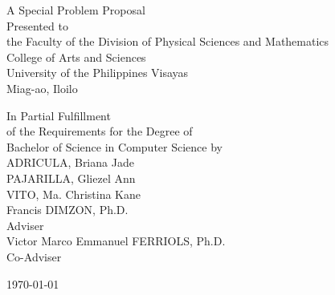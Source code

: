 \begin{titlepage}
\centering


\vspace{1.75cm}
A Special Problem Proposal\\
Presented to\\
the Faculty of the Division of Physical Sciences and Mathematics\\
College of Arts and Sciences\\
University of the Philippines Visayas\\
Miag-ao, Iloilo

\vspace{1.75cm}
In Partial Fulfillment\\
of the Requirements for the Degree of\\
Bachelor of Science in Computer Science
\vspace{1.75cm}
by\\

\vspace{1cm}
ADRICULA, Briana Jade  \\
PAJARILLA, Gliezel Ann  \\
VITO, Ma. Christina Kane  \\

\vspace{1.75cm}
Francis DIMZON, Ph.D.\\
Adviser\\
Victor Marco Emmanuel FERRIOLS, Ph.D.\\
Co-Adviser

\vspace{1.5cm}
\today
\end{titlepage}
